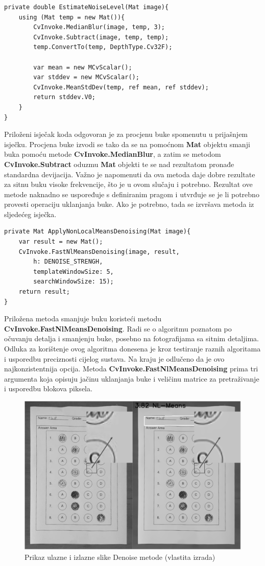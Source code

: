 \documentclass{foi}
\begin{document}
\begin{lstlisting}[caption={Procjena razine buke na slici}]
private double EstimateNoiseLevel(Mat image){
    using (Mat temp = new Mat()){
        CvInvoke.MedianBlur(image, temp, 3);
        CvInvoke.Subtract(image, temp, temp);
        temp.ConvertTo(temp, DepthType.Cv32F);

        var mean = new MCvScalar();
        var stddev = new MCvScalar();
        CvInvoke.MeanStdDev(temp, ref mean, ref stddev);
        return stddev.V0;
    }
}
\end{lstlisting}

Priloženi isječak koda odgovoran je za procjenu buke spomenutu u prijašnjem isječku. Procjena buke izvodi se tako da se na pomoćnom \textbf{Mat} objektu smanji buka pomoću metode \textbf{CvInvoke.MedianBlur}, a zatim se metodom \textbf{CvInvoke.Subtract} oduzmu \textbf{Mat} objekti te se nad rezultatom pronađe standardna devijacija. Važno je napomenuti da ova metoda daje dobre rezultate za sitnu buku visoke frekvencije, što je u ovom slučaju i potrebno. Rezultat ove metode naknadno se uspoređuje s definiranim pragom i utvrđuje se je li potrebno provesti operaciju uklanjanja buke. Ako je potrebno, tada se izvršava metoda iz sljedećeg isječka.

\begin{lstlisting}[caption={Metoda za smanjenje buke}]
private Mat ApplyNonLocalMeansDenoising(Mat image){
    var result = new Mat();
    CvInvoke.FastNlMeansDenoising(image, result,
        h: DENOISE_STRENGH,
        templateWindowSize: 5,
        searchWindowSize: 15);
    return result;
}
\end{lstlisting}

Priložena metoda smanjuje buku koristeći metodu \textbf{CvInvoke.FastNlMeansDenoising}. Radi se o algoritmu poznatom po očuvanju detalja i smanjenju buke, posebno na fotografijama sa sitnim detaljima. Odluka za korištenje ovog algoritma donesena je kroz testiranje raznih algoritama i usporedbu preciznosti cijelog sustava. Na kraju je odlučeno da je ovo najkonzistentnija opcija. Metoda \textbf{CvInvoke.FastNlMeansDenoising} prima tri argumenta koja opisuju jačinu uklanjanja buke i veličinu matrice za pretraživanje i usporedbu blokova piksela.


\begin{figure}[H]
\centering
\includegraphics[width=0.8\linewidth]{slike/DenoiseComparison.png}
\caption{Prikaz ulazne i izlazne slike Denoise metode (vlastita izrada)}
\end{figure}
\end{document}
